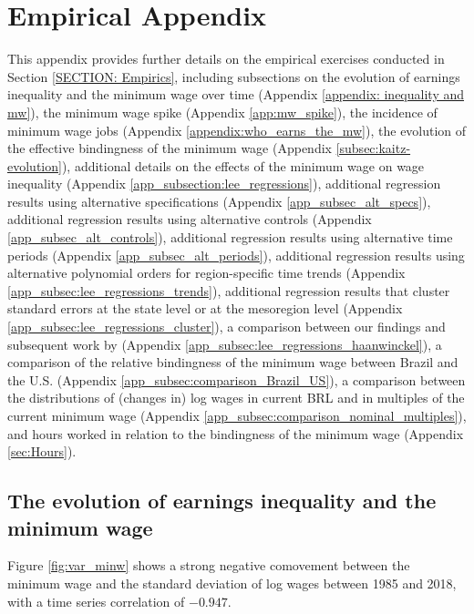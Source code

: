 
\section{Empirical Appendix\label{APPENDIX: Empirics}}

This appendix provides further details on the empirical exercises conducted in Section \ref{SECTION: Empirics}, including subsections on %
%
the evolution of earnings inequality and the minimum wage over time (Appendix \ref{appendix: inequality and mw}), %
%
the minimum wage spike (Appendix \ref{app:mw_spike}), %
%
the incidence of minimum wage jobs (Appendix \ref{appendix:who_earns_the_mw}), %
%
the evolution of the effective bindingness of the minimum wage (Appendix \ref{subsec:kaitz-evolution}), %
%
additional details on the effects of the minimum wage on wage inequality (Appendix \ref{app_subsection:lee_regressions}), %
%
additional regression results using alternative specifications (Appendix \ref{app_subsec_alt_specs}), %
%
additional regression results using alternative controls (Appendix \ref{app_subsec_alt_controls}), %
%
additional regression results using alternative time periods (Appendix \ref{app_subsec_alt_periods}), %
%
additional regression results using alternative polynomial orders for region-specific time trends (Appendix \ref{app_subsec:lee_regressions_trends}), %
%
additional regression results that cluster standard errors at the state level or at the mesoregion level (Appendix \ref{app_subsec:lee_regressions_cluster}), %
%
a comparison between our findings and subsequent work by  (Appendix \ref{app_subsec:lee_regressions_haanwinckel}), %
%
a comparison of the relative bindingness of the minimum wage between Brazil and the U.S. (Appendix \ref{app_subsec:comparison_Brazil_US}), %
%
a comparison between the distributions of (changes in) log wages in current BRL and in multiples of the current minimum wage (Appendix \ref{app_subsec:comparison_nominal_multiples}), and %
%
hours worked in relation to the bindingness of the minimum wage (Appendix \ref{sec:Hours}). %



\clearpage
\subsection{The evolution of earnings inequality and the minimum wage\label{appendix: inequality and mw}}

Figure \ref{fig:var_minw} shows a strong negative comovement between the minimum wage and the
standard deviation of log wages between 1985 and 2018, with a time series correlation of $-0.947$.

